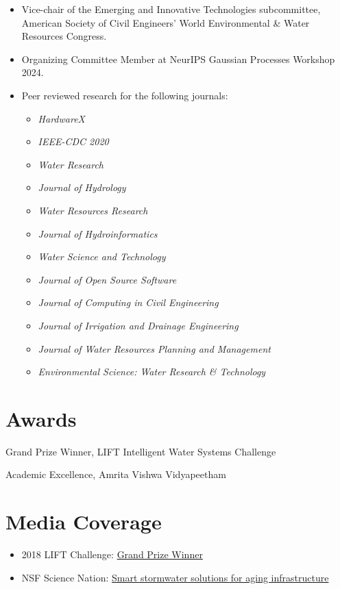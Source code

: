 \documentclass[a4paper,11pt]{article}
\newcommand{\years}[1]{%
  {\reversemarginpar\strut\marginnote{{\small#1}}}%
}
\begin{document}
\begin{itemize}
	\item Vice-chair of the Emerging and Innovative Technologies subcommittee, American Society of Civil Engineers' World Environmental \& Water Resources Congress.
	\item Organizing Committee Member at NeurIPS Gaussian Processes Workshop 2024.
	\item Peer reviewed research for the following journals:
	\begin{itemize}
	\setlength\itemsep{0mm}
		\item \textit{HardwareX}
		\item \textit{IEEE-CDC 2020}
		\item \textit{Water Research}
		\item \textit{Journal of Hydrology}
		\item \textit{Water Resources Research}
		\item \textit{Journal of Hydroinformatics}
		\item \textit{Water Science and Technology}
		\item \textit{Journal of Open Source Software}
		\item \textit{Journal of Computing in Civil Engineering}
		\item \textit{Journal of Irrigation and Drainage Engineering}
		\item \textit{Journal of Water Resources Planning and Management}
		\item \textit{Environmental Science: Water Research \& Technology}
	\end{itemize}
\end{itemize}

\section*{Awards}
\years{2018}
Grand Prize Winner, LIFT Intelligent Water Systems Challenge\\

\years{2013, 2015}
Academic Excellence, Amrita Vishwa Vidyapeetham

\section*{Media Coverage}

\begin{itemize}
	\item 2018 LIFT Challenge: \href{https://cee.engin.umich.edu/stories/joint-u-m-and-glwa-team-wins-inaugural-intelligent-water-challenge/}{Grand Prize Winner}
	\item NSF Science Nation: \href{https://www.youtube.com/watch?v=mStPThxAU08}{Smart stormwater solutions for aging infrastructure}
\end{itemize}
\end{document}
